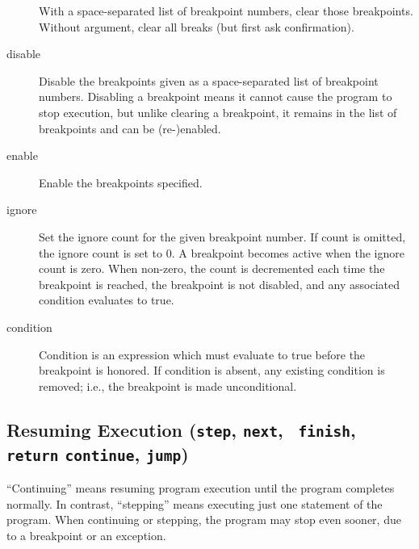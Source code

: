 \begin{description}
With a space-separated list of breakpoint numbers, clear those
breakpoints.  Without argument, clear all breaks (but first
ask confirmation).

\item[disable \optional{\var{bpnumber} \optional{\var{bpnumber \ldots}}}]

Disable the breakpoints given as a space-separated list of
breakpoint numbers.  Disabling a breakpoint means it cannot cause
the program to stop execution, but unlike clearing a breakpoint, it
remains in the list of breakpoints and can be (re-)enabled.

\item[enable \optional{\var{bpnumber} \optional{\var{bpnumber \ldots}}}]

Enable the breakpoints specified.

\item[ignore \var{bpnumber} \optional{\var{count}}]

Set the ignore count for the given breakpoint number.  If count is
omitted, the ignore count is set to 0.  A breakpoint becomes active
when the ignore count is zero.  When non-zero, the count is
decremented each time the breakpoint is reached, the breakpoint is not
disabled, and any associated condition evaluates to true.

\item[condition \var{bpnumber} \optional{\var{condition}}]

Condition is an expression which must evaluate to true before
the breakpoint is honored.  If condition is absent, any existing
condition is removed; i.e., the breakpoint is made unconditional.

\end{description}

\subsection{Resuming Execution ({\tt step}, {\tt next}, {\tt
    finish}, {\tt return} {\tt continue}, {\tt jump})\label{subsubsection-resume}}

``Continuing'' means resuming program execution until the program
completes normally.  In contrast, ``stepping'' means executing just
one statement of the program. When continuing or stepping, the program may stop even sooner, due to a breakpoint or an
exception.

